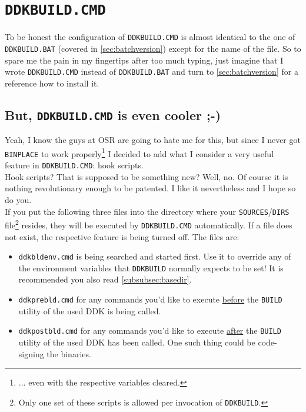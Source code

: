 \documentclass[a4paper,titlepage]{report}
\begin{document}
\section{\texttt{DDKBUILD.CMD}}
\label{sec:ntscriptversion}
To be honest the configuration of \texttt{DDKBUILD.CMD} is almost identical to the one of
\texttt{DDKBUILD.BAT} (covered in \autoref{sec:batchversion}) except for the name of the file.
So to spare me the pain in my fingertips after too much typing, just imagine that I
wrote \texttt{DDKBUILD.CMD} instead of \texttt{DDKBUILD.BAT} and turn to \autoref{sec:batchversion}
for a reference how to install it.

\subsection{But, \texttt{DDKBUILD.CMD} is even cooler \textsf{;-)}}
\label{subsec:buildscripts}
Yeah, I know the guys at OSR are going to hate me for this, but since I never got \texttt{BINPLACE}
to work properly\footnote{... even with the respective variables cleared.} I decided to
add what I consider a very useful feature in \texttt{DDKBUILD.CMD}: hook scripts.\\

Hook scripts? That is supposed to be something new? Well, no. Of course it is nothing
revolutionary enough to be patented. I like it nevertheless and I hope so do you.\\

If you put the following three files into the directory where your \texttt{SOURCES}/\texttt{DIRS}
file\footnote{Only one set of these scripts is allowed per invocation of \texttt{DDKBUILD}.}
resides, they will be executed by \texttt{DDKBUILD.CMD} automatically.
If a file does not exist, the respective feature is being turned off. The files are:
\begin{itemize}
  \item \texttt{ddkbldenv.cmd} is being searched and started first. Use it to override any of the environment
  variables that \texttt{DDKBUILD} normally expects to be set! It is recommended you also read \autoref{subsubsec:basedir}.
  \item \texttt{ddkprebld.cmd} for any commands you'd like to execute \underline{before} the \texttt{BUILD}
  utility of the used DDK is being called.
  \item \texttt{ddkpostbld.cmd} for any commands you'd like to execute \underline{after} the \texttt{BUILD}
  utility of the used DDK has been called. One such thing could be code-signing the binaries.
\end{itemize}
\end{document}
